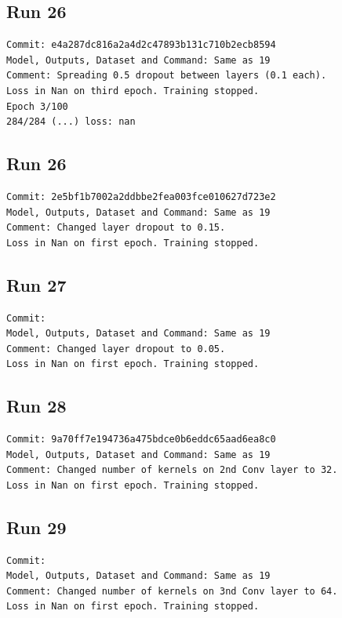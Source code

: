 \subsection{Run 26}
\begin{verbatim}
Commit: e4a287dc816a2a4d2c47893b131c710b2ecb8594  
Model, Outputs, Dataset and Command: Same as 19
Comment: Spreading 0.5 dropout between layers (0.1 each).
Loss in Nan on third epoch. Training stopped.
Epoch 3/100
284/284 (...) loss: nan
\end{verbatim}

\subsection{Run 26}
\begin{verbatim}
Commit: 2e5bf1b7002a2ddbbe2fea003fce010627d723e2  
Model, Outputs, Dataset and Command: Same as 19
Comment: Changed layer dropout to 0.15.
Loss in Nan on first epoch. Training stopped.
\end{verbatim}

\subsection{Run 27}
\begin{verbatim}
Commit:   
Model, Outputs, Dataset and Command: Same as 19
Comment: Changed layer dropout to 0.05.
Loss in Nan on first epoch. Training stopped.
\end{verbatim}

\subsection{Run 28}
\begin{verbatim}
Commit: 9a70ff7e194736a475bdce0b6eddc65aad6ea8c0  
Model, Outputs, Dataset and Command: Same as 19
Comment: Changed number of kernels on 2nd Conv layer to 32.
Loss in Nan on first epoch. Training stopped.
\end{verbatim}

\subsection{Run 29}
\begin{verbatim}
Commit:   
Model, Outputs, Dataset and Command: Same as 19
Comment: Changed number of kernels on 3nd Conv layer to 64.
Loss in Nan on first epoch. Training stopped.
\end{verbatim}

